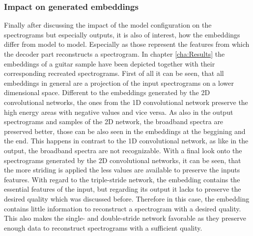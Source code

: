 \subsubsection{Impact on generated embeddings}
Finally after discussing the impact of the model configuration on the spectrograms but especially outputs, it is also of interest, how the embeddings differ from model to model. Especially as those represent the features from which the decoder part reconstructs a spectrogram. In chapter \ref{cha:Results} the embeddings of a guitar sample have been depicted together with their corresponding recreated spectrograms. First of all it can be seen, that all embeddings in general are a projection of the input spectrograms on a lower dimensional space. Different to the embeddings generated by the 2D convolutional networks, the ones from the 1D convolutional network preserve the high energy areas with negative values and vice versa. As also in the output spectrograms and samples of the 2D network, the broadband spectra are preserved better, those can be also seen in the embeddings at the beggining and the end. This happens in contrast to the 1D convolutional network, as like in the output, the broadband spectra are not recognizable. With a final look onto the spectrograms generated by the 2D convolutional networks, it can be seen, that the more striding is applied the less values are available to preserve the inputs features. With regard to the triple-stride network, the embedding contains the essential features of the input, but regarding its output it lacks to preserve the desired quality which was discussed before. Therefore in this case, the embedding contains little information to reconstruct a spectrogram with a desired quality. This also makes the single- and double-stride network favorable as they preserve enough data to reconstruct spectrograms with a sufficient quality.


